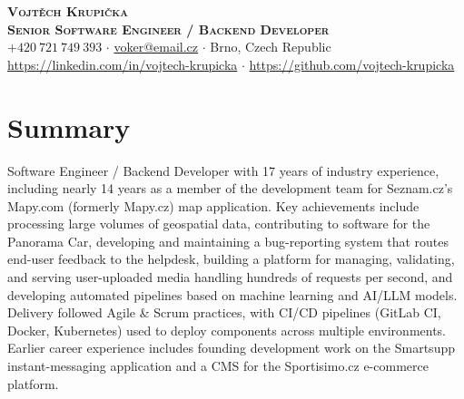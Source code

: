 \documentclass[letterpaper,11pt]{article}
\begin{document}


    \textbf{\Huge \scshape Vojtěch Krupička} \\ \vspace{6pt} 
    \textbf{\Large \scshape Senior Software Engineer / Backend Developer} \\ \vspace{4pt} 
    \small $+420\ 721\ 749\ 393$ $\cdot$ \href{mailto:voker@email.cz}{voker@email.cz} $\cdot$ Brno, Czech Republic \\
    \href{https://linkedin.com/in/vojtech-krupicka}{https://linkedin.com/in/vojtech-krupicka} $\cdot$ \href{https://github.com/vojtech-krupicka}{https://github.com/vojtech-krupicka}   


\section{Summary}
{Software Engineer / Backend Developer with 17 years of industry experience, including nearly 14 years as a member of the development team for Seznam.cz's Mapy.com (formerly Mapy.cz) map application. Key achievements include processing large volumes of geospatial data, contributing to software for the Panorama Car, developing and maintaining a bug-reporting system that routes end-user feedback to the helpdesk, building a platform for managing, validating, and serving user-uploaded media handling hundreds of requests per second, and developing automated pipelines based on machine learning and AI/LLM models. Delivery followed Agile \& Scrum practices, with CI/CD pipelines (GitLab CI, Docker, Kubernetes) used to deploy components across multiple environments. Earlier career experience includes founding development work on the Smartsupp instant-messaging application and a CMS for the Sportisimo.cz e-commerce platform.}
\end{document}
